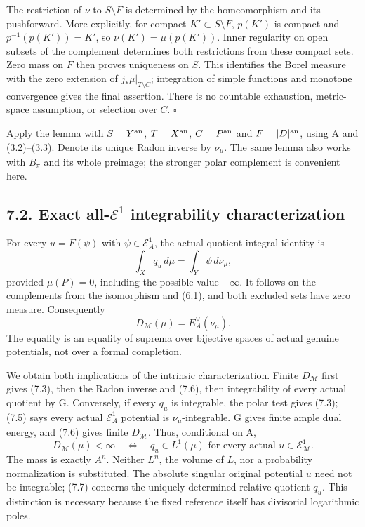 \documentclass[
  10pt,
]{article}
\begin{document}
The restriction of \(\nu\) to \(S\setminus F\) is determined by the
homeomorphism and its pushforward. More explicitly, for compact
\(K'\subset S\setminus F\), \(p(K')\) is compact and
\(p^{-1}(p(K'))=K'\), so \(\nu(K')=\mu(p(K'))\). Inner regularity on
open subsets of the complement determines both restrictions from these
compact sets. Zero mass on \(F\) then proves uniqueness on \(S\). This
identifies the Borel measure with the zero extension of
\(j_*\mu|_{T\setminus C}\); integration of simple functions and monotone
convergence gives the final assertion. There is no countable exhaustion,
metric-space assumption, or selection over \(C\). \(\square\)

Apply the lemma with \(S=Y^{\rm an}\), \(T=X^{\rm an}\),
\(C=P^{\rm an}\) and \(F=|D|^{\rm an}\), using A and (3.2)--(3.3).
Denote its unique Radon inverse by \(\nu_\mu\). The same lemma also
works with \(B_\pi\) and its whole preimage; the stronger polar
complement is convenient here.

\subsection{\texorpdfstring{7.2. Exact all-\(\mathcal E^1\)
integrability
characterization}{7.2. Exact all-\textbackslash mathcal E\^{}1 integrability characterization}}\label{exact-all-mathcal-e1-integrability-characterization}

For every \(u=F(\psi)\) with \(\psi\in\mathcal E^1_A\), the actual
quotient integral identity is \[
 \int_Xq_u\,d\mu=\int_Y\psi\,d\nu_\mu,
 \tag{7.5}
\] provided \(\mu(P)=0\), including the possible value \(-\infty\). It
follows on the complements from the isomorphism and (6.1), and both
excluded sets have zero measure. Consequently \[
 D_{\mathcal M}(\mu)=E_A^\vee(\nu_\mu).
 \tag{7.6}
\] The equality is an equality of suprema over bijective spaces of
actual genuine potentials, not over a formal completion.

We obtain both implications of the intrinsic characterization. Finite
\(D_{\mathcal M}\) first gives (7.3), then the Radon inverse and (7.6),
then integrability of every actual quotient by G. Conversely, if every
\(q_u\) is integrable, the polar test gives (7.3); (7.5) says every
actual \(\mathcal E^1_A\) potential is \(\nu_\mu\)-integrable. G gives
finite ample dual energy, and (7.6) gives finite \(D_{\mathcal M}\).
Thus, conditional on A, \[
 \boxed{\ D_{\mathcal M}(\mu)<\infty\quad\Longleftrightarrow\quad
     q_u\in L^1(\mu)\text{ for every actual }u\in\mathcal E^1_{\mathcal M}.\ }
 \tag{7.7}
\] The mass is exactly \(A^n\). Neither \(L^n\), the volume of \(L\),
nor a probability normalization is substituted. The absolute singular
original potential \(u\) need not be integrable; (7.7) concerns the
uniquely determined relative quotient \(q_u\). This distinction is
necessary because the fixed reference itself has divisorial logarithmic
poles.
\end{document}
